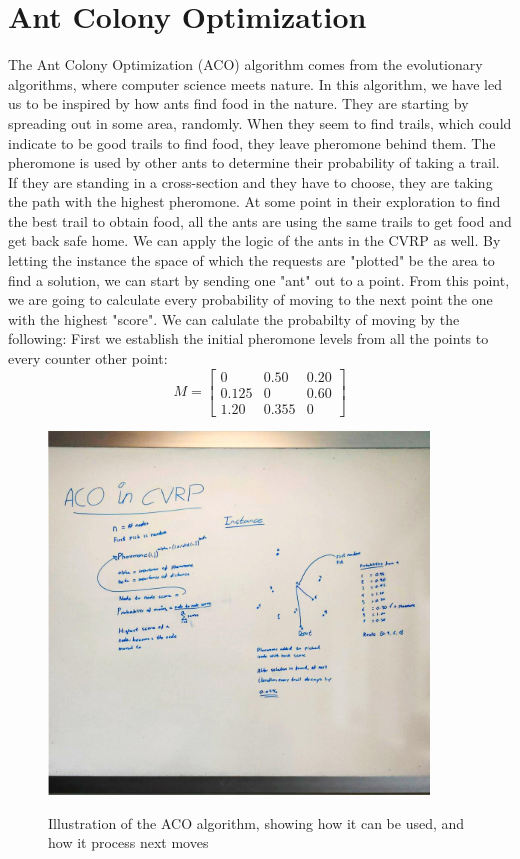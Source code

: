 \documentclass[12pt]{article}
\begin{document}
\section{Ant Colony Optimization}
The Ant Colony Optimization (ACO) algorithm comes from the evolutionary algorithms, where computer science meets nature. In this algorithm, 
we have led us to be inspired by how ants find food in the nature. They are starting by spreading out in some area, randomly. When they seem to find trails, 
which could indicate to be good trails to find food, they leave pheromone behind them. The pheromone is used by other ants to determine their probability of taking 
a trail. If they are standing in a cross-section and they have to choose, they are taking the path with the highest pheromone. 
At some point in their exploration to find the best trail to obtain food, all the ants are using the same trails to get food and get back safe home. 
\newline
We can apply the logic of the ants in the CVRP as well. By letting the instance \- the space of which the requests are "plotted" \- be the area to find a solution, 
we can start by sending one "ant" out to a point. From this point, we are going to calculate every probability of moving to the next point \- the one with the highest "score". 
We can calulate the probabilty of moving by the following: 
\newline
First we establish the initial pheromone levels from all the points to every counter other point: \\
\[
M = \begin{bmatrix}
    0 & 0.50 & 0.20           \\[0.3em]
    0.125 & 0           & 0.60 \\[0.3em]
    1.20 & 0.355 & 0
  \end{bmatrix}
\]
\begin{figure}[H]
	\caption{Illustration of the ACO algorithm, showing how it can be used, and how it process next moves}
	\centering
	\includegraphics[width=0.9\textwidth]{ACO_Whiteboard.jpg}
	\label{fig:acowhiteboard}

\end{figure}
\end{document}
